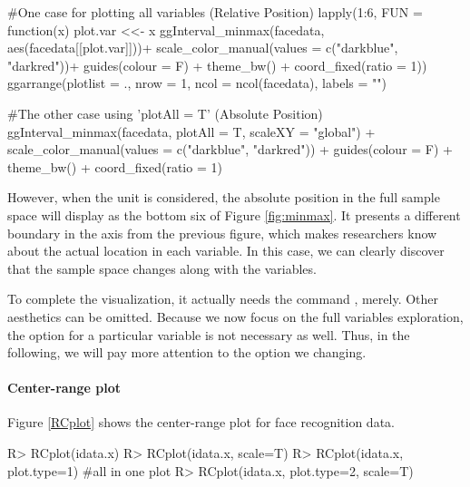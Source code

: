 \documentclass[article]{jss}
\begin{document}
\begin{CodeChunk}
\begin{CodeInput}
#One case for plotting all variables (Relative Position)
lapply(1:6, FUN = function(x){
  plot.var <<- x
  ggInterval_minmax(facedata, aes(facedata[[plot.var]]))+
    scale_color_manual(values = c("darkblue", "darkred"))+
    guides(colour = F) + 
    theme_bw() + 
    coord_fixed(ratio = 1)}) %
  ggarrange(plotlist = ., nrow = 1, ncol = ncol(facedata), labels = "")

#The other case using 'plotAll = T' (Absolute Position)
ggInterval_minmax(facedata, plotAll = T, scaleXY = "global") +
  scale_color_manual(values = c("darkblue", "darkred")) +
               guides(colour = F) + 
               theme_bw() + 
               coord_fixed(ratio = 1)
\end{CodeInput}
\end{CodeChunk}



However, when the unit is considered, the absolute position in the full sample space will display as the bottom six of Figure \ref{fig:minmax}. It presents a different boundary in the axis from the previous figure, which makes researchers know about the actual location in each variable. In this case, we can clearly discover that the sample space changes along with the variables.

To complete the visualization, it actually needs the command , merely. Other aesthetics can be omitted. Because we now focus on the full variables exploration, the  option for a particular variable is not necessary as well. Thus, in the following, we will pay more attention to the option we changing.




\paragraph{Center-range plot}
Figure \ref{RCplot} shows the center-range plot for face recognition data.
\begin{CodeChunk}
\begin{CodeInput}
R> RCplot(idata.x)
R> RCplot(idata.x, scale=T)
R> RCplot(idata.x, plot.type=1) #all in one plot
R> RCplot(idata.x, plot.type=2, scale=T)
\end{CodeInput}
\end{CodeChunk}
\end{document}
